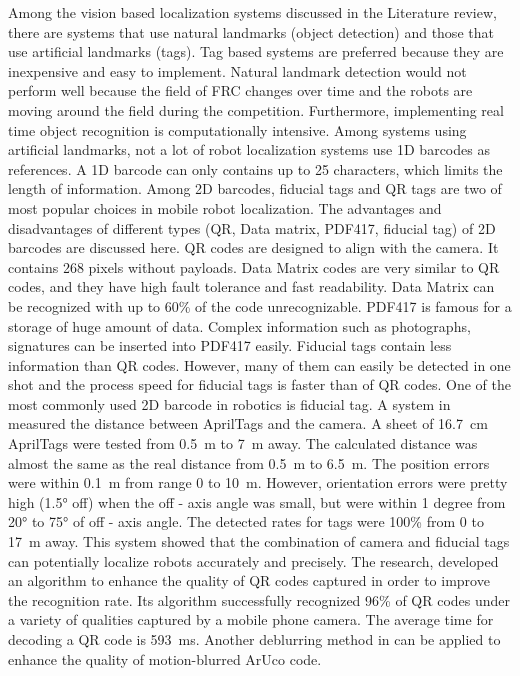 \documentclass{article}
\begin{document}
  Among the vision based localization systems discussed in the Literature review, there are systems that use natural landmarks (object detection) and those that use artificial landmarks (tags). Tag based systems are preferred because they are inexpensive and easy to implement. Natural landmark detection would not perform well because the field of FRC changes over time and the robots are moving around the field during the competition. Furthermore, implementing real time object recognition is computationally intensive. Among systems using artificial landmarks, not a lot of robot localization systems use 1D barcodes as references. A 1D barcode can only contains up to 25 characters, which limits the length of information. Among 2D barcodes, fiducial tags and QR tags are two of most popular choices in mobile robot localization. The advantages and disadvantages of different types (QR, Data matrix, PDF417, fiducial tag) of 2D barcodes are discussed here. QR codes are designed to align with the camera. It contains 268 pixels without payloads. Data Matrix codes are very similar to QR codes, and they have high fault tolerance and fast readability. Data Matrix can be recognized with up to 60\% of the code unrecognizable. PDF417 is famous for a storage of huge amount of data. Complex information such as photographs, signatures can be inserted into PDF417 easily. Fiducial tags contain less information than QR codes. However, many of them can easily be detected in one shot and the process speed for fiducial tags is faster than of QR codes. One of the most commonly used 2D barcode in robotics is fiducial tag. A system in \cite{wang_apriltag_2016} measured the distance between AprilTags and the camera. A sheet of \SI{16.7}{\centi\meter} AprilTags were tested from \SI {0.5}{\meter} to \SI{7}{\meter} away. The calculated distance was almost the same as the real distance from \SI{0.5}{\meter} to \SI{6.5}{\meter}. The position errors were within \SI{0.1}{\meter} from range 0 to \SI{10}{\meter}. However, orientation errors were pretty high (\ang{1.5} off) when the off - axis angle was small, but were within 1 degree from \ang{20} to \ang{75} of off - axis angle. The detected rates for tags were 100\% from 0 to \SI{17}{\meter} away. This system showed that the combination of camera and fiducial tags can potentially localize robots accurately and precisely. The research, \cite{chen_two-stage_2013} developed an algorithm to enhance the quality of QR codes captured in order to improve the recognition rate. Its algorithm successfully recognized 96\% of QR codes under a variety of qualities captured by a mobile phone camera. The average time for decoding a QR code is \SI{593}{\milli\second}. Another deblurring method in \cite{xu_2d_2011} can be applied to enhance the quality of motion-blurred ArUco code.
\end{document}
